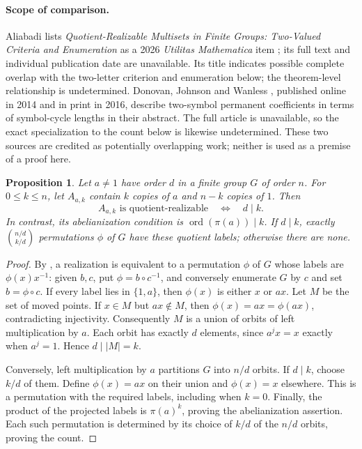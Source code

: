 \documentclass[11pt]{article}
\newtheorem{proposition}[theorem]{Proposition}
\begin{document}
\paragraph{Scope of comparison.}
Aliabadi lists \emph{Quotient-Realizable Multisets in Finite Groups:
Two-Valued Criteria and Enumeration} as a 2026 \emph{Utilitas Mathematica}
item \cite{AliabadiTwo}; its full text and individual publication date
are unavailable. Its title indicates possible complete overlap with the
two-letter criterion and enumeration below; the theorem-level relationship
is undetermined. Donovan, Johnson and Wanless \cite{DJW}, published online
in 2014 and in print in 2016, describe two-symbol permanent coefficients
in terms of symbol-cycle lengths in their abstract. The full article is
unavailable, so the exact specialization to the count below is likewise
undetermined. These two sources are credited as potentially overlapping
work; neither is used as a premise of a proof here.
\begin{proposition}\label{prop:sparse}
Let $a\ne1$ have order $d$ in a finite group $G$ of order $n$.
For $0\leq k\leq n$, let $A_{a,k}$ contain $k$ copies of $a$ and
$n-k$ copies of $1$. Then
\[
 A_{a,k}\text{ is quotient-realizable}\quad\Longleftrightarrow\quad d\mid k.
\]
In contrast, its abelianization condition is
$\operatorname{ord}(\pi(a))\mid k$.
If $d\mid k$, exactly $\binom{n/d}{k/d}$ permutations $\phi$ of $G$
have these quotient labels; otherwise there are none.
\end{proposition}
\begin{proof}
By \cite[Lemma 2.2]{Aliabadi}, a realization is equivalent to a
permutation $\phi$ of $G$ whose labels are $\phi(x)x^{-1}$:
given $b,c$, put $\phi=b\circ c^{-1}$, and conversely enumerate
$G$ by $c$ and set $b=\phi\circ c$.
If every label lies in $\{1,a\}$, then $\phi(x)$ is either $x$ or $ax$.
Let $M$ be the set of moved points. If $x\in M$ but $ax\notin M$,
then $\phi(x)=ax=\phi(ax)$, contradicting injectivity.
Consequently $M$ is a union of orbits of left multiplication by $a$.
Each orbit has exactly $d$ elements, since $a^jx=x$ exactly when
$a^j=1$. Hence $d\mid |M|=k$.

Conversely, left multiplication by $a$ partitions $G$ into $n/d$ orbits.
If $d\mid k$, choose $k/d$ of them. Define $\phi(x)=ax$ on their
union and $\phi(x)=x$ elsewhere. This is a permutation with the
required labels, including when $k=0$. Finally, the product of the
projected labels is $\pi(a)^k$, proving the abelianization assertion.
Each such permutation is determined by its choice of $k/d$ of the
$n/d$ orbits, proving the count.
\end{proof}
\end{document}
